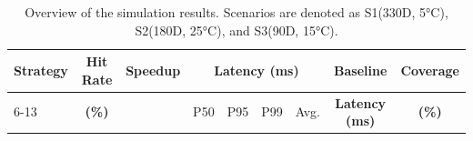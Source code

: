 \begin{table}[t]
\centering
\caption{Overview of the simulation results.  Scenarios are denoted as S1(330D, 5°C), S2(180D, 25°C), and S3(90D, 15°C).}
\label{tab:performance_metrics}
\small
\begin{tabular}{l| cc|cc|cc|cc|cc|cc|cc|cc}
\toprule
 
\multirow{1}{*}{\textbf{Strategy}} &\multicolumn{2}{c|}{\textbf{Hit Rate}}  & \multicolumn{2}{c|}{\textbf{Speedup}} & \multicolumn{8}{c|}{\textbf{Latency (ms)}} &  \multicolumn{2}{c|}{\textbf{Baseline}}  & \multicolumn{2}{c}{\textbf{Coverage}} \\
\cmidrule(lr){6-13} 
\multicolumn{1}{l|}{\textbf{(Scenario)}}& \multicolumn{2}{c|}{\textbf{ (\%)}}&\multicolumn{2}{c|}{}& \multicolumn{2}{c|}{P50} & \multicolumn{2}{c|}{P95} & \multicolumn{2}{c|}{P99} &\multicolumn{2}{c|}{Avg.} &\multicolumn{2}{c|}{\textbf{Latency (ms)}}&\multicolumn{2}{c}{\textbf{ (\%)}}  \\


\end{tabular}
\end{table}
